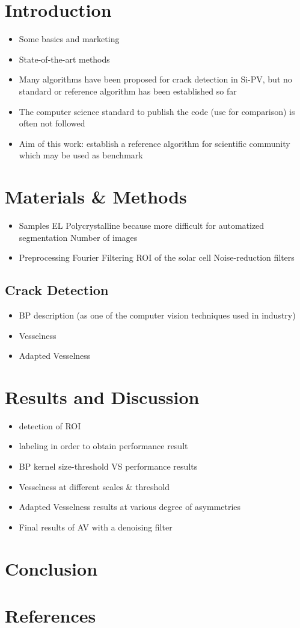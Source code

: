 \documentclass[conference]{IEEEtran}
\begin{document}
\section{Introduction}
\begin{itemize}
	\item Some basics and marketing
	\item  State-of-the-art methods
	\item Many algorithms have been proposed for crack detection in Si-PV, but no standard or reference algorithm has been established so far
	\item The computer science standard to publish the code (use for comparison) is often not followed  
	\item Aim of this work: establish a reference algorithm for scientific community which may be used as benchmark
\end{itemize}
 

\section{Materials \& Methods}
\begin{itemize}
	\item Samples 
	\subitem EL
	\subitem Polycrystalline because more difficult for automatized segmentation
	\subitem Number of images
	
	\item Preprocessing
	\subitem Fourier Filtering
	\subitem ROI of the solar cell
	\subitem Noise-reduction filters
\end{itemize}

\subsection{Crack Detection}
\begin{itemize}
	\item BP description (as one of the computer vision techniques used in industry)
	\item Vesselness
	\item  Adapted Vesselness
\end{itemize}

\section{Results and Discussion}
\begin{itemize}
	\item detection of ROI
	\item labeling in order to obtain performance result
	\item BP kernel size-threshold VS performance results
	\item Vesselness at different scales \& threshold
	\item Adapted Vesselness results at various degree of asymmetries
	\item Final results of AV with a denoising filter
\end{itemize}


\section{Conclusion}


\section{References}
\end{document}
